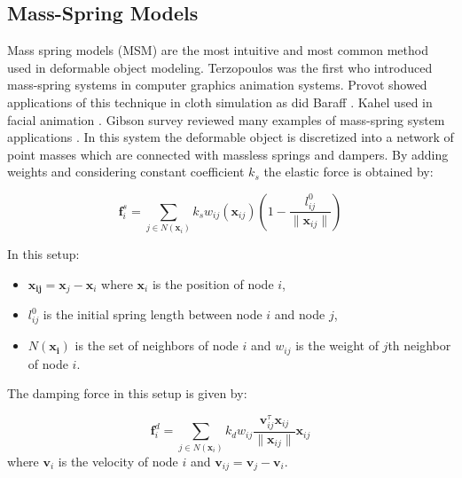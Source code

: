 \subsection{Mass-Spring Models}
Mass spring models (MSM) are the most intuitive and most common method used in deformable object modeling.
Terzopoulos \etal \cite{terzopoulos1988modeling, terzopoulos1987elastically} was the first who introduced mass-spring systems in 
computer graphics animation systems. Provot \etal showed applications of this technique in cloth simulation \cite{provot1995deformation}
as did Baraff \etal \cite{baraff1998large}. Kahel \etal used in facial animation \cite{kahler2001geometry}. 
Gibson \etal survey reviewed many examples of mass-spring system applications \cite{Gibson1997a}. In this system the deformable object
is discretized into a network of point masses which are connected with massless springs and dampers. By adding weights and considering
constant coefficient $k_s$ the elastic force is obtained by:

\begin{equation}
 \boldsymbol{f}^s_i = \sum_{j \in N(\boldsymbol{x}_i)} k_s w_{ij}(\boldsymbol{x}_{ij})(1-\frac{l^0_{ij}}{\| \boldsymbol{x}_{ij} \|})
\end{equation}

In this setup:

\begin{itemize}
 \item $\boldsymbol{x_{ij}} = \boldsymbol{x}_j - \boldsymbol{x}_i$ where $\boldsymbol{x}_i$ is the position of node $i$, 
 \item $l^0_{ij}$ is the initial spring length between node $i$ and node $j$,
 \item $N(\boldsymbol{x_i})$ is the set of neighbors of node $i$ and $w_{ij}$ is the weight of $j$th neighbor of node $i$.
\end{itemize}

The damping force in this setup is given by:

\begin{equation}
 \boldsymbol{f}^d_i = \sum_{j \in N(\boldsymbol{x}_i)} k_d w_{ij} \frac{\boldsymbol{v}^\tau_{ij} \boldsymbol{x}_{ij} }{\|\boldsymbol{x}_{ij} \|} \boldsymbol{x}_{ij}
\end{equation}
where $\boldsymbol{v}_i$ is the velocity of node $i$ and $\boldsymbol{v}_{ij} = \boldsymbol{v}_j - \boldsymbol{v}_i$.

